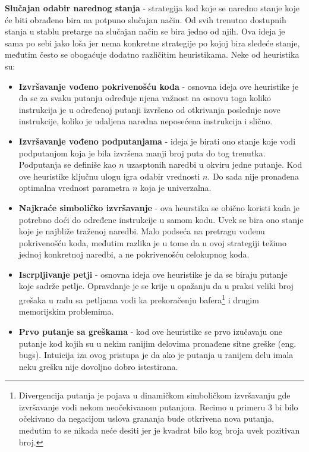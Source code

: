 \documentclass[12pt]{article}
\begin{document}
\bigbreak

\textbf{Slučajan odabir narednog stanja} - strategija kod koje se naredno stanje koje će biti obrađeno bira na potpuno slučajan način. Od svih trenutno dostupnih stanja u stablu pretarge na slučajan način se bira jedno od njih. Ova ideja je sama po sebi jako loša jer nema konkretne strategije po kojoj bira sledeće stanje, međutim često se obogaćuje dodatno različitim heuristikama. Neke od heuristika su:

\begin{itemize}
    \item \textbf{Izvršavanje vođeno pokrivenošću koda} - osnovna ideja ove heuristike je da se za svaku putanju određuje njena važnost na osnovu toga koliko instrukcija je u određenoj putanji izvršeno od otkrivanja poslednje nove instrukcije, koliko je udaljena naredna neposećena instrukcija i slično.
    
    \item \textbf{Izvršavanje vođeno podputanjama} - ideja je birati ono stanje koje vodi podputanjom koja je bila izvršena manji broj puta do tog trenutka. Podputanja se definiše kao $n$ uzasptonih naredbi u okviru jedne putanje. Kod ove heuristike ključnu ulogu igra odabir vrednosti $n$. Do sada nije pronađena optimalna vrednost parametra $n$ koja je univerzalna.
    
    \item \textbf{Najkraće simboličko izvršavanje} - ova heurstika se obično koristi kada je potrebno doći do određene instrukcije u samom kodu. Uvek se bira ono stanje koje je najbliže traženoj naredbi. Malo podseća na pretragu vođenu pokrivenošću koda, međutim razlika je u tome da u ovoj strategiji težimo jednoj konkretnoj naredbi, a ne pokrivenošću celokupnog koda.
    
    \item \textbf{Iscrpljivanje petji} - osnovna ideja ove heuristike je da se biraju putanje koje sadrže petlje. Opravdanje je se krije u opažanju da u praksi veliki broj grešaka u radu sa petljama vodi ka prekoračenju bafera\footnote[2]{Divergencija putanja je pojava u dinamičkom simboličkom izvršavanju gde izvršavanje vodi nekom neočekivanom putanjom. Recimo u primeru 3 bi bilo očekivano da negacijom uslova grananja bude otkrivena nova putanja, međutim to se nikada neće desiti jer je kvadrat bilo kog broja uvek pozitivan broj.} i drugim memorijskim problemima.
    
    \item \textbf{Prvo putanje sa greškama} - kod ove heuristike se prvo izučavaju one putanje kod kojih su u nekim ranijim delovima pronađene sitne greške (eng. bugs). Intuicija iza ovog pristupa je da ako je putanja u ranijem delu imala neku grešku nije dovoljno dobro istestirana.
\end{itemize}
\end{document}
